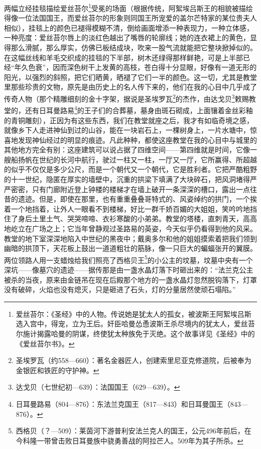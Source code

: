 \par 两幅立经挂毯描绘爱丝苔尔\footnote{爱丝苔尔：《圣经》中的人物。传说她是犹太人的孤女，被波斯王阿絮埃吕斯选入宫中，得宠，立为王后。奸臣哈曼怂恿波斯王杀尽境内的犹太人，爱丝苔尔施计揭露哈曼的阴谋，终使犹太种族免于灭绝。这个故事详见《圣经》中的《爱丝苔尔书》。}受冕的场面（根据传统，阿絮埃吕斯王的相貌被描绘得像一位法国国王，而爱丝苔尔的形象则同国王所宠爱的盖尔芒特家的某位贵夫人相似），挂毯上的颜色已褪得模糊不清，倒给画面增添一种表现力，一种立体感，一种亮度：爱丝苔尔唇上的淡红色越出了嘴唇的轮廓线；她的连衣裙上的黄色，显得那么滑腻，那么厚实，仿佛已板结成块，吹来一股气流就能把它整块掀掉似的。在这幅丝线和羊毛交织成的挂毯的下半部，树木还绿得那样鲜艳，可是上半部已经“年久色衰”，因而深色树干上发黄的高枝，苍白得十分显眼，好像有一道无形的阳光，以强烈的斜照，把它们晒黄，晒褪了它们一半的颜色。这一切，尤其是教堂里那些珍贵的文物，原先是由历史上的名人传下来的，他们在我的心目中几乎成了传奇人物（那个精雕细刻的金十字架，据说是圣埃罗瓦\footnote{圣埃罗瓦（约558—660）：著名金器匠人，创建索里尼亚克修道院，后被奉为金银匠和铁匠的守护神。}的杰作，由达戈贝\footnote{达戈贝（七世纪初—639）：法国国王（629—639）。}敕赐教堂的，还有日耳曼路易\footnote{日耳曼路易（804—876）：东法兰克国王（817—843）和日耳曼国王（843—876）。}的王子们的合葬墓，墓身由斑石砌成，上面镶着金丝彩釉的青铜雕刻），正因为有这些东西，我们在教堂就座之后，我才有如临奇境之感，就像乡下人走进神仙到过的山谷，能在一块岩石上，一棵树身上，一片水塘中，惊喜地发现神仙经过的明显的痕迹。凡此种种，都使这座教堂在我的心目中与城里的其他地方完全有别：这座建筑可以说占据了四维空间——第四维就是时间，它像一艘船扬帆在世纪的长河中航行，驶过一柱又一柱，一厅又一厅，它所赢得、所超越的似乎不仅仅是多少公尺，而是一个朝代又一个朝代，它是胜利者。它把严酷粗野的十一世纪，隐匿在厚实的墙壁中，沉重的拱梁下填满了大块碎石，把风洞堵得严严密密，只有门廊附近登上钟楼的楼梯才在墙上破开一条深深的槽口，露出一点往昔的遗迹。但是，即使在那里，也有重重叠叠哥特式的、风姿绰约的拱门，一个挨着一个地挡着，让外人一眼看不到楼梯，好比一群千娇百媚的大姐姐，笑吟吟地挡住了身后土里土气、哭哭啼啼、衣衫寒酸的小弟弟。教堂的塔楼，直刺青天，高高地屹立在广场之上；它当年曾静观过圣路易的英姿，今天似乎仍看得到他的风采。教堂的地下室深深地陷入中世纪的黑夜中；戴奥多尔和他的姐姐摸索着把我们领到幽暗的拱顶下，天花板上鼓出一道道粗壮的筋脉，像一只巨大的蝙蝠张开的翼膜。两位领路人用一支蜡烛给我们照亮了西格贝王\footnote{西格贝（？—509）：莱茵河下游普利安法兰克人的国王，公元496年前后，在今科隆一带曾击败日耳曼族中骁勇善战的阿拉芒人。509年为其子所杀。}的小公主的坟墓，坟墓中央有一个深坑——像墓穴的遗迹——据传那是由一盏水晶灯落下时砸出来的：“法兰克公主被杀的当夜，原来由金链吊在现在后殿那个地方的一盏水晶灯忽然脱钩落下，灯罩没有破碎，火焰也没有熄灭，只是砸进了石头，灯的分量居然使顽石塌陷。”
